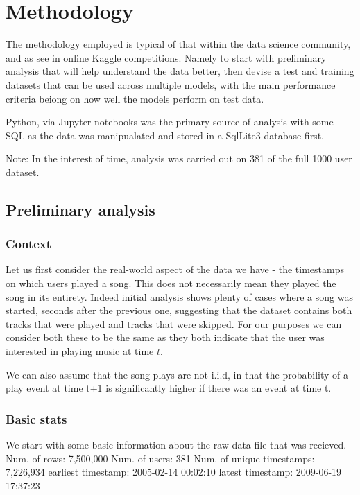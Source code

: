 
\chapter{Methodology} %

\label{Chapter3} %

The methodology employed is typical of that within the data science community, and as see in online Kaggle competitions. Namely to start with preliminary analysis that will help understand the data better, then devise a test and training datasets that can be used across multiple models, with the main performance criteria beiong on how well the models perform on test data.

Python, via Jupyter notebooks was the primary source of analysis with some SQL as the data was manipualated and stored in a SqlLite3 database first.

Note: In the interest of time, analysis was carried out on 381 of the full 1000 user dataset.

\section{Preliminary analysis}

\subsection{Context}

Let us first consider the real-world aspect of the data we have - the timestamps on which users played a song. This does not necessarily mean they played the song in its entirety. Indeed initial analysis shows plenty of cases where a song was started, seconds after the previous one, suggesting that the dataset contains both tracks that were played and tracks that were skipped. For our purposes we can consider both these to be the same as they both indicate that the user was interested in playing music at time $t$.

We can also assume that the song plays are not i.i.d, in that the probability of a play event at time t+1 is significantly higher if there was an event at time t. 

\subsection{Basic stats} 

We start with some basic information about the raw data file that was recieved. 
Num. of rows: 7,500,000
Num. of users: 381
Num. of unique timestamps: 7,226,934
earliest timestamp: 2005-02-14 00:02:10
latest timestamp: 2009-06-19 17:37:23

